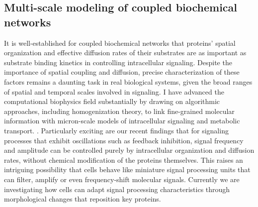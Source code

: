 \subsection*{Multi-scale modeling of coupled biochemical networks}
\begin{refsection}
It is well-established for coupled biochemical networks that proteins' spatial organization and effective diffusion rates of their substrates are as important as substrate binding kinetics in controlling intracellular signaling.
Despite the importance of spatial coupling and diffusion, precise characterization of these factors remains a daunting task in real biological systems, given the broad ranges of spatial and temporal scales involved in signaling.
I have advanced the computational biophysics field substantially by drawing on algorithmic approaches, including homogenization theory, to link fine-grained molecular information with micron-scale models of intracellular signaling and metabolic transport.
\autocite{Metzger2014,Eun2014,Eun2013,Kekenes-Huskey2012b,Kekenes-Huskey2014a}.
Particularly exciting are our recent findings \autocite{Kekenes-Huskey2015} that for  signaling processes that exhibit oscillations such as feedback inhibition,  signal frequency and amplitude can be controlled purely by intracellular organization and diffusion rates, without chemical modification of the proteins themselves. 
This raises an intriguing possibility that cells behave like miniature signal processing units that can filter, amplify or even frequency-shift molecular signals. 
Currently we are investigating how cells can adapt signal processing characteristics through morphological changes that reposition key proteins. 


\printbibliography[heading=none] %
\end{refsection}



